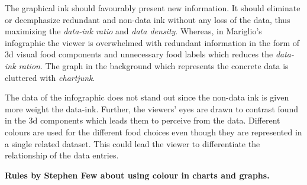 The graphical ink should favourably present new information. It should eliminate
or deemphasize redundant and non-data ink without any loss of the data, thus
maximizing the \textit{data-ink ratio} and \textit{data density}. Whereas, in
Mariglio's infographic the viewer is overwhelmed with redundant information in
the form of 3d visual food components and unnecessary food labels which reduces
the \textit{data-ink ration}. The graph in the background which represents the
concrete data is cluttered with \textit{chartjunk}.

The data of the infographic does not stand out since the non-data ink is given
more weight the data-ink. Further, the viewers' eyes are drawn to contrast found
in the 3d components which leads them to perceive from the data. Different
colours are used for the different food choices even though they are represented
in a single related dataset. This could lead the viewer to differentiate the
relationship of the data entries.

\textbf{Rules by Stephen Few about using colour in charts and graphs.}




